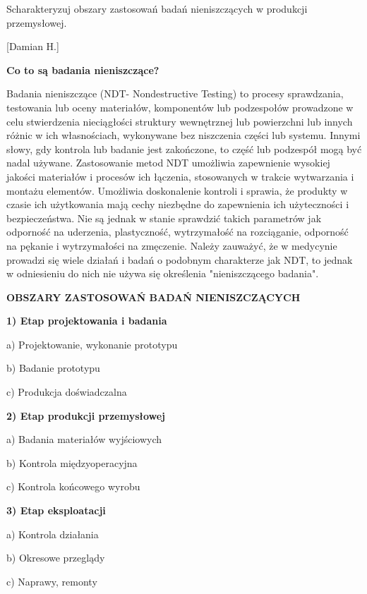 \documentclass{article}
\begin{document}
\begin{enumerate}
{\Large \bf  \item Scharakteryzuj obszary zastosowań badań nieniszczących w produkcji
przemysłowej.} [Damian H.]




{\bf Co to są badania nieniszczące?}


Badania nieniszczące (NDT- Nondestructive Testing) to procesy sprawdzania, testowania lub oceny materiałów, komponentów lub podzespołów prowadzone w celu stwierdzenia nieciągłości struktury wewnętrznej lub powierzchni lub innych różnic w ich własnościach, wykonywane bez niszczenia części lub systemu. Innymi słowy, gdy kontrola lub badanie jest zakończone, to część lub podzespół mogą być nadal używane. 
Zastosowanie metod NDT umożliwia zapewnienie wysokiej jakości materiałów i procesów ich łączenia, stosowanych w trakcie wytwarzania i montażu elementów. Umożliwia doskonalenie kontroli i sprawia, że produkty w czasie ich użytkowania mają cechy niezbędne do zapewnienia ich użyteczności i bezpieczeństwa. Nie są jednak w stanie sprawdzić takich parametrów jak odporność na uderzenia, plastyczność, wytrzymałość na rozciąganie, odporność na pękanie i wytrzymałości na zmęczenie. Należy zauważyć, że w medycynie prowadzi się wiele działań i badań o podobnym charakterze jak NDT, to jednak w odniesieniu do nich nie używa się określenia "nieniszczącego badania". 


{\bf OBSZARY ZASTOSOWAŃ BADAŃ NIENISZCZĄCYCH}

{\bf 1) Etap projektowania i badania}

a) Projektowanie, wykonanie prototypu

b) Badanie prototypu

c) Produkcja doświadczalna

{\bf 2) Etap produkcji przemysłowej}

a) Badania materiałów wyjściowych

b) Kontrola międzyoperacyjna

c) Kontrola końcowego wyrobu

{\bf 3) Etap eksploatacji}

a) Kontrola działania

b) Okresowe przeglądy

c) Naprawy, remonty












\end{enumerate}
\end{document}
